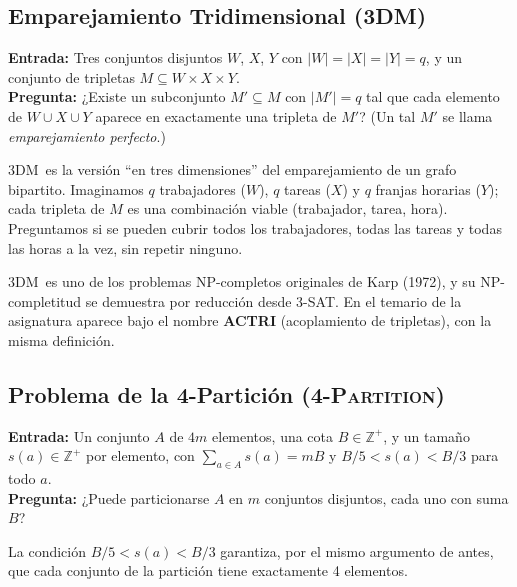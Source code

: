 \documentclass[12pt,a4paper]{article}
\theoremstyle{definition}
\theoremstyle{remark}
\newcommand{\FPART}{\textsc{4-Partition}}
\newcommand{\DM}{\textsc{3DM}}
\begin{document}
\subsection{Emparejamiento Tridimensional (\DM)}

\begin{tcolorbox}[colback=green!5, colframe=green!40, title={\DM\ (3-Dimensional Matching) [SP1]}]
\textbf{Entrada:} Tres conjuntos disjuntos $W$, $X$, $Y$ con $|W|=|X|=|Y|=q$,
y un conjunto de tripletas $M \subseteq W \times X \times Y$.\\
\textbf{Pregunta:} ¿Existe un subconjunto $M' \subseteq M$ con $|M'| = q$
tal que cada elemento de $W \cup X \cup Y$ aparece en exactamente una
tripleta de $M'$? (Un tal $M'$ se llama \emph{emparejamiento perfecto}.)
\end{tcolorbox}

\begin{intuicion}
\DM\ es la versión ``en tres dimensiones'' del emparejamiento de un grafo
bipartito. Imaginamos $q$ trabajadores ($W$), $q$ tareas ($X$) y $q$ franjas
horarias ($Y$); cada tripleta de $M$ es una combinación viable
(trabajador, tarea, hora). Preguntamos si se pueden cubrir todos los
trabajadores, todas las tareas y todas las horas a la vez, sin repetir ninguno.
\end{intuicion}

\DM\ es uno de los problemas NP-completos originales de Karp (1972), y su
NP-completitud se demuestra por reducción desde 3-SAT. En el temario de la
asignatura aparece bajo el nombre \textbf{ACTRI} (acoplamiento de tripletas),
con la misma definición.

\subsection{Problema de la 4-Partición (\FPART)}

\begin{tcolorbox}[colback=orange!5, colframe=orange!40, title={\FPART\ (4-Partition)}]
\textbf{Entrada:} Un conjunto $A$ de $4m$ elementos, una cota $B \in \mathbb{Z}^+$,
y un tamaño $s(a) \in \mathbb{Z}^+$ por elemento, con
$\sum_{a \in A} s(a) = m B$ y $B/5 < s(a) < B/3$ para todo $a$.\\
\textbf{Pregunta:} ¿Puede particionarse $A$ en $m$ conjuntos disjuntos, cada uno
con suma $B$?
\end{tcolorbox}

La condición $B/5 < s(a) < B/3$ garantiza, por el mismo argumento de antes, que
cada conjunto de la partición tiene exactamente 4 elementos.
\end{document}
